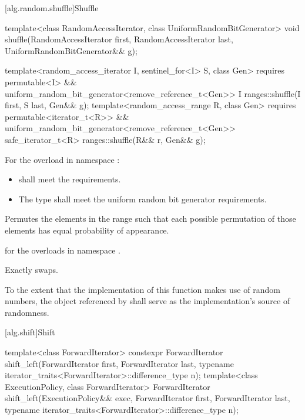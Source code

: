 [alg.random.shuffle]{Shuffle}

%
\begin{itemdecl}
template<class RandomAccessIterator, class UniformRandomBitGenerator>
  void shuffle(RandomAccessIterator first,
               RandomAccessIterator last,
               UniformRandomBitGenerator&& g);

template<random_access_iterator I, sentinel_for<I> S, class Gen>
  requires permutable<I> &&
           uniform_random_bit_generator<remove_reference_t<Gen>>
  I ranges::shuffle(I first, S last, Gen&& g);
template<random_access_range R, class Gen>
  requires permutable<iterator_t<R>> &&
           uniform_random_bit_generator<remove_reference_t<Gen>>
  safe_iterator_t<R> ranges::shuffle(R&& r, Gen&& g);
\end{itemdecl}

\begin{itemdescr}
\pnum
\requires
For the overload in namespace :
\begin{itemize}
\item
   shall meet
  the  requirements.
\item
  The type  shall meet
  the uniform random bit generator requirements.
\end{itemize}

\pnum
\effects
Permutes the elements in the range 
such that each possible permutation of those elements
has equal probability of appearance.

\pnum
\returns
{} for the overloads in namespace .

\pnum
\complexity
Exactly  swaps.

\pnum
\remarks
To the extent that the implementation of this function makes use
of random numbers, the object referenced by  shall serve as
the implementation's source of randomness.
\end{itemdescr}

[alg.shift]{Shift}

%
\begin{itemdecl}
template<class ForwardIterator>
  constexpr ForwardIterator
    shift_left(ForwardIterator first, ForwardIterator last,
               typename iterator_traits<ForwardIterator>::difference_type n);
template<class ExecutionPolicy, class ForwardIterator>
  ForwardIterator
    shift_left(ExecutionPolicy&& exec, ForwardIterator first, ForwardIterator last,
               typename iterator_traits<ForwardIterator>::difference_type n);
\end{itemdecl}

